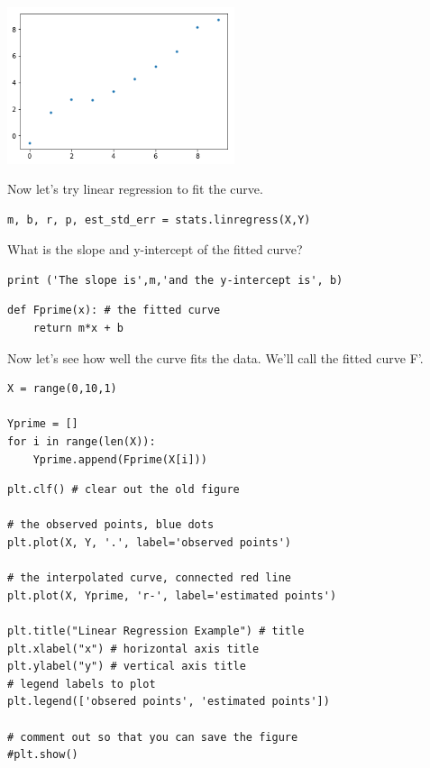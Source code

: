 \begin{center}
\includegraphics[width=0.5\textwidth]{scipy/output_30_0.png}
\end{center}

Now let's try linear regression to fit the curve.

\begin{verbatim}
m, b, r, p, est_std_err = stats.linregress(X,Y)
\end{verbatim}

What is the slope and y-intercept of the fitted curve?

\begin{verbatim}
print ('The slope is',m,'and the y-intercept is', b)
\end{verbatim}

\begin{verbatim}
def Fprime(x): # the fitted curve
    return m*x + b
\end{verbatim}

Now let's see how well the curve fits the data. We'll call the fitted
curve F'.

\begin{verbatim}
X = range(0,10,1)

Yprime = []
for i in range(len(X)):
    Yprime.append(Fprime(X[i]))
\end{verbatim}

\begin{verbatim}
plt.clf() # clear out the old figure

# the observed points, blue dots
plt.plot(X, Y, '.', label='observed points') 

# the interpolated curve, connected red line
plt.plot(X, Yprime, 'r-', label='estimated points')  

plt.title("Linear Regression Example") # title
plt.xlabel("x") # horizontal axis title
plt.ylabel("y") # vertical axis title
# legend labels to plot
plt.legend(['obsered points', 'estimated points']) 

# comment out so that you can save the figure
#plt.show()
\end{verbatim}

